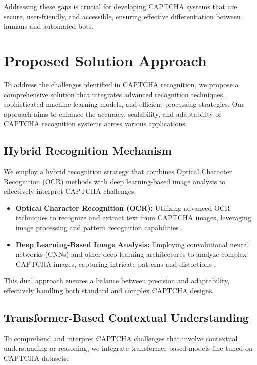 \documentclass[sigconf]{acmart}
\begin{document}
Addressing these gaps is crucial for developing CAPTCHA systems that are secure, user-friendly, and accessible, ensuring effective differentiation between humans and automated bots.


\section{Proposed Solution Approach}

To address the challenges identified in CAPTCHA recognition, we propose a comprehensive solution that integrates advanced recognition techniques, sophisticated machine learning models, and efficient processing strategies. Our approach aims to enhance the accuracy, scalability, and adaptability of CAPTCHA recognition systems across various applications.

\subsection{Hybrid Recognition Mechanism}

We employ a hybrid recognition strategy that combines Optical Character Recognition (OCR) methods with deep learning-based image analysis to effectively interpret CAPTCHA challenges:

\begin{itemize}
    \item \textbf{Optical Character Recognition (OCR):} Utilizing advanced OCR techniques to recognize and extract text from CAPTCHA images, leveraging image processing and pattern recognition capabilities \cite{turn0search0}.
    \item \textbf{Deep Learning-Based Image Analysis:} Employing convolutional neural networks (CNNs) and other deep learning architectures to analyze complex CAPTCHA images, capturing intricate patterns and distortions \cite{turn0academia10}.
\end{itemize}

This dual approach ensures a balance between precision and adaptability, effectively handling both standard and complex CAPTCHA designs.

\subsection{Transformer-Based Contextual Understanding}

To comprehend and interpret CAPTCHA challenges that involve contextual understanding or reasoning, we integrate transformer-based models fine-tuned on CAPTCHA datasets:
\end{document}
